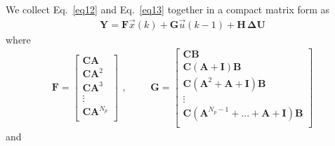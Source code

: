 \documentclass[11pt,a4paper,oneside]{book}
\numberwithin{equation}{section}
\theoremstyle{it}
\theoremstyle{definition}
\begin{document}
We collect Eq.~\eqref{eq12} and Eq.~\eqref{eq13} together in a compact matrix 
form as
\begin{equation}\label{eq15}
	\begin{aligned}
		\mathbf{Y}= 
		\mathbf{F}\vec{x}(k)+\mathbf{G}\vec{u}(k-1)+\mathbf{H}\,\mathbf{\Delta 
		U}
	\end{aligned}
\end{equation}
where 
\begin{equation}\label{eq16}
	\begin{aligned}
		\mathbf{F}= \begin{bmatrix}
			\mathbf{C}\mathbf{A} \\[6pt]
			\mathbf{C}\mathbf{A}^2 \\[6pt]
			\mathbf{C}\mathbf{A}^3 \\[6pt]
			\vdots \\[6pt]
			\mathbf{C}\mathbf{A}^{N_p} \\[6pt]
		\end{bmatrix}
	\end{aligned}, \qquad
	\begin{aligned}
		\mathbf{G}= \begin{bmatrix}
			\mathbf{C}\mathbf{B} \\[6pt]
			\mathbf{C}\left(\mathbf{A} +\mathbf{I}\right) \mathbf{B} \\[6pt]
			\mathbf{C}\left(\mathbf{A}^2+\mathbf{A} +\mathbf{I}\right) 
			\mathbf{B} \\[6pt]
			\vdots \\[6pt]
			\mathbf{C}\left(\mathbf{A}^{N_p-1}+...+\mathbf{A} 
			+\mathbf{I}\right)\mathbf{B} \\[6pt]
		\end{bmatrix}
	\end{aligned}
\end{equation}
and
\end{document}
